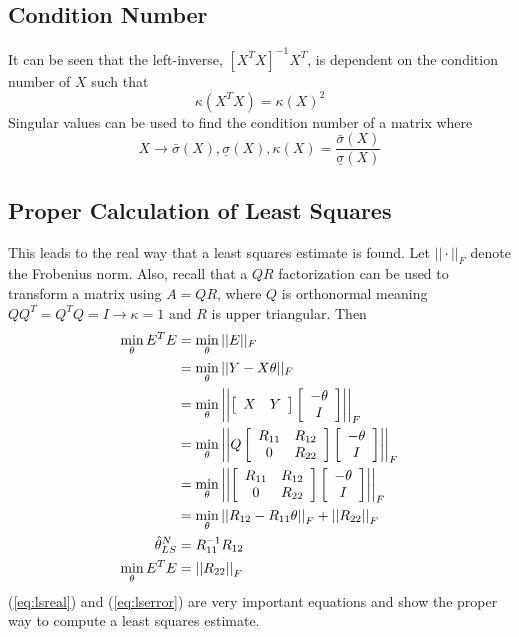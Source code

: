 \documentclass[lecture,12pt,]{pcms-l}
\begin{document}
\subsection{Condition Number}
It can be seen that the left-inverse, $[X^TX]^{-1}X^T$, is dependent on the condition number of $X$ such that
$$\kappa(X^TX) = \kappa(X)^2$$
Singular values can be used to find the condition number of a matrix where
$$X\rightarrow \bar{\sigma}(X), \underline{\sigma}(X), \kappa(X)=\frac{\bar{\sigma}(X)}{\underline{\sigma}(X)}$$

\subsection{Proper Calculation of Least Squares}
This leads to the real way that a least squares estimate is found. Let $||\cdot||_F$ denote the Frobenius norm. Also, recall that a $QR$ factorization can be used to transform a matrix using $A=QR$, where $Q$ is orthonormal meaning $QQ^T=Q^TQ=I\rightarrow\kappa=1$ and $R$ is upper triangular. Then
\begin{align}
\min_\theta E^TE &= \min_\theta||E||_F \nonumber \\
&= \min_\theta||Y-X\theta||_F \nonumber \\
&= \min_\theta\left|\left|\left[\begin{array}{c c} X & Y \end{array}\right] \left[\begin{array}{c} -\theta \\ I \end{array}\right]\right|\right|_F \nonumber \\
&= \min_\theta\left|\left|Q\left[\begin{array}{c c} R_{11} & R_{12} \\ 0 & R_{22} \end{array}\right] \left[\begin{array}{c} -\theta \\ I \end{array}\right]\right|\right|_F \nonumber \\
&= \min_\theta\left|\left|\left[\begin{array}{c c} R_{11} & R_{12} \\ 0 & R_{22} \end{array}\right] \left[\begin{array}{c} -\theta \\ I \end{array}\right]\right|\right|_F \nonumber \\
&= \min_\theta\left|\left|R_{12}-R_{11}\theta\right|\right|_F + \left|\left|R_{22}\right|\right|_F \nonumber \\
\label{eq:lsreal}
\hat{\theta}_{LS}^N &= R_{11}^{-1}R_{12} \\
\label{eq:lserror}
\min_\theta E^TE &= \left|\left|R_{22}\right|\right|_F
\end{align}
(\ref{eq:lsreal}) and (\ref{eq:lserror}) are very important equations and show the proper way to compute a least squares estimate.
\end{document}
